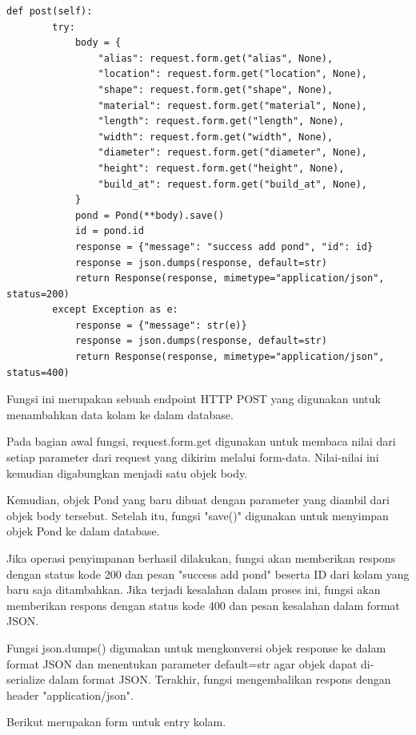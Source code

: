 \begin{enumerate}[1.]
\begin{lstlisting}
def post(self):
        try:
            body = {
                "alias": request.form.get("alias", None),
                "location": request.form.get("location", None),
                "shape": request.form.get("shape", None),
                "material": request.form.get("material", None),
                "length": request.form.get("length", None),
                "width": request.form.get("width", None),
                "diameter": request.form.get("diameter", None),
                "height": request.form.get("height", None),
                "build_at": request.form.get("build_at", None),
            }
            pond = Pond(**body).save()
            id = pond.id
            response = {"message": "success add pond", "id": id}
            response = json.dumps(response, default=str)
            return Response(response, mimetype="application/json", status=200)
        except Exception as e:
            response = {"message": str(e)}
            response = json.dumps(response, default=str)
            return Response(response, mimetype="application/json", status=400)
\end{lstlisting}

Fungsi ini merupakan sebuah endpoint HTTP POST yang digunakan untuk menambahkan data kolam ke dalam database.

Pada bagian awal fungsi, request.form.get digunakan untuk membaca nilai dari setiap parameter dari request yang dikirim melalui form-data. Nilai-nilai ini kemudian digabungkan menjadi satu objek body.

Kemudian, objek Pond yang baru dibuat dengan parameter yang diambil dari objek body tersebut. Setelah itu, fungsi "save()" digunakan untuk menyimpan objek Pond ke dalam database.

Jika operasi penyimpanan berhasil dilakukan, fungsi akan memberikan respons dengan status kode 200 dan pesan "success add pond" beserta ID dari kolam yang baru saja ditambahkan. Jika terjadi kesalahan dalam proses ini, fungsi akan memberikan respons dengan status kode 400 dan pesan kesalahan dalam format JSON.

Fungsi json.dumps() digunakan untuk mengkonversi objek response ke dalam format JSON dan menentukan parameter default=str agar objek dapat di-serialize dalam format JSON. Terakhir, fungsi mengembalikan respons dengan header "application/json".

Berikut merupakan form untuk entry kolam.


\end{enumerate}
